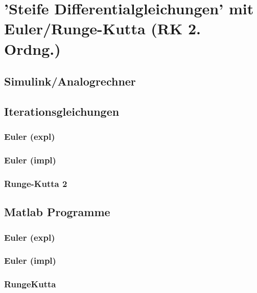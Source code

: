 \documentclass[10pt]{scrartcl}
\author{André Harms, Oliver Steenbuck}
\title{\titletext}
\date{02.11.2011}
\begin{document}
\maketitle

\setcounter{tocdepth}{3}
\tableofcontents

\section{'Steife Differentialgleichungen' mit Euler/Runge-Kutta (RK 2. Ordng.)}
	\subsection{Simulink/Analogrechner}
	
	\subsection{Iterationsgleichungen}
		\subsubsection{Euler (expl)}
		
		\subsubsection{Euler (impl)}
		
		\subsubsection{Runge-Kutta 2}
		
	\subsection{Matlab Programme}
		\subsubsection{Euler (expl)}
			
		
		\subsubsection{Euler (impl)}
				
		
		\subsubsection{Runge\-Kutta}
				
		
\end{document}
